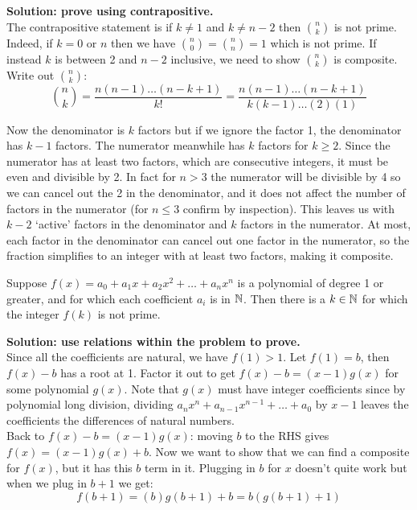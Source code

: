 \documentclass{article}
\begin{document}
\textbf{Solution: prove using contrapositive.}
\\

The contrapositive statement is if $k \neq 1$ and $k \neq n - 2$ then $\binom{n}{k}$ is not prime. Indeed, if $k = 0$ or $n$ then we have $\binom{n}{0} = \binom{n}{n} = 1$ which is not prime. If instead $k$ is between 2 and $n - 2$ inclusive, we need to show $\binom{n}{k}$ is composite. Write out $\binom{n}{k}$:
$$\binom{n}{k} = \frac{n(n-1)\ldots(n-k+1)}{k!} = \frac{n(n-1)\ldots(n-k+1)}{k(k-1)\ldots(2)(1)}$$

Now the denominator is $k$ factors but if we ignore the factor 1, the denominator has $k -1$ factors. The numerator meanwhile has $k$ factors for $k \geq 2$. Since the numerator has at least two factors, which are consecutive integers, it must be even and divisible by 2. In fact for $n > 3$ the numerator will be divisible by 4 so we can cancel out the 2 in the denominator, and it does not affect the number of factors in the numerator (for $n \leq 3$ confirm by inspection). This leaves us with $k - 2$ `active' factors in the denominator and $k$ factors in the numerator. At most, each factor in the denominator can cancel out one factor in the numerator, so the fraction simplifies to an integer with at least two factors, making it composite.

\begin{problem}
Suppose $f(x) = a_0 + a_1x + a_2 x^2 + \ldots + a_n x^n$ is a polynomial of degree 1 or greater, and for which each coefficient $a_i$ is in $\mathbb{N}$. Then there is a $k \in \mathbb{N}$ for which the integer $f(k)$ is not prime.
\end{problem}
\textbf{Solution: use relations within the problem to prove.}
\\

Since all the coefficients are natural, we have $f(1) > 1$. Let $f(1) = b$, then $f(x) - b$ has a root at 1. Factor it out to get $f(x) - b = (x - 1)g(x)$ for some polynomial $g(x)$. Note that $g(x)$ must have integer coefficients since by polynomial long division, dividing $a_n x^n + a_{n-1}x^{n-1} + \ldots + a_0$ by $x - 1$ leaves the coefficients the differences of natural numbers.
\\

Back to $f(x) - b = (x - 1)g(x)$: moving $b$ to the RHS gives $f(x) = (x - 1)g(x) + b$. Now we want to show that we can find a composite for $f(x)$, but it has this $b$ term in it. Plugging in $b$ for $x$ doesn't quite work but when we plug in $b + 1$ we get:
$$f(b + 1) = (b)g(b+1) + b = b(g(b+1) + 1)$$
\end{document}
